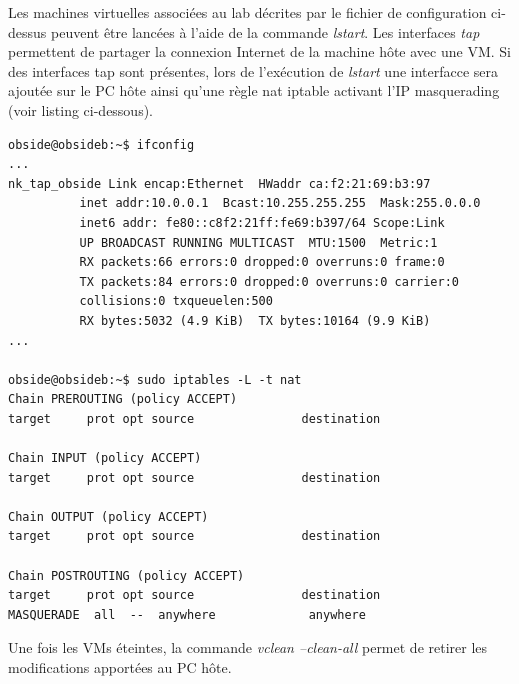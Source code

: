 \documentclass[frenchb, 11pt]{article}
\begin{document}
Les machines virtuelles associées au lab décrites par le fichier de configuration ci-dessus peuvent être lancées à l'aide de la commande \emph{lstart}. Les interfaces \emph{tap} permettent de partager la connexion Internet de la machine hôte avec une VM. Si des interfaces tap sont présentes, lors de l'exécution de \emph{lstart} une interfacce sera ajoutée sur le PC hôte ainsi qu'une règle nat iptable activant l'IP masquerading (voir listing ci-dessous).

\begin{lstlisting}
obside@obsideb:~$ ifconfig
...
nk_tap_obside Link encap:Ethernet  HWaddr ca:f2:21:69:b3:97  
          inet addr:10.0.0.1  Bcast:10.255.255.255  Mask:255.0.0.0
          inet6 addr: fe80::c8f2:21ff:fe69:b397/64 Scope:Link
          UP BROADCAST RUNNING MULTICAST  MTU:1500  Metric:1
          RX packets:66 errors:0 dropped:0 overruns:0 frame:0
          TX packets:84 errors:0 dropped:0 overruns:0 carrier:0
          collisions:0 txqueuelen:500 
          RX bytes:5032 (4.9 KiB)  TX bytes:10164 (9.9 KiB)
...

obside@obsideb:~$ sudo iptables -L -t nat
Chain PREROUTING (policy ACCEPT)
target     prot opt source               destination         

Chain INPUT (policy ACCEPT)
target     prot opt source               destination         

Chain OUTPUT (policy ACCEPT)
target     prot opt source               destination         

Chain POSTROUTING (policy ACCEPT)
target     prot opt source               destination         
MASQUERADE  all  --  anywhere             anywhere  
\end{lstlisting}
Une fois les VMs éteintes, la commande \emph{vclean --clean-all} permet de retirer les modifications apportées au PC hôte.
\end{document}
